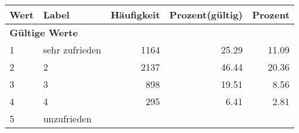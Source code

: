      \begin{longtable}{lXrrr}
     \toprule
     \textbf{Wert} & \textbf{Label} & \textbf{Häufigkeit} & \textbf{Prozent(gültig)} & \textbf{Prozent} \\
     \endhead
     \midrule
     \multicolumn{5}{l}{\textbf{Gültige Werte}}\\

     1 &
     \multicolumn{1}{X}{ sehr zufrieden   } &


       \num{1164} &
       \num[round-mode=places,round-precision=2]{25,29} &
         \num[round-mode=places,round-precision=2]{11,09} \\

     2 &
     \multicolumn{1}{X}{ 2   } &


       \num{2137} &
       \num[round-mode=places,round-precision=2]{46,44} &
         \num[round-mode=places,round-precision=2]{20,36} \\

     3 &
     \multicolumn{1}{X}{ 3   } &


       \num{898} &
       \num[round-mode=places,round-precision=2]{19,51} &
         \num[round-mode=places,round-precision=2]{8,56} \\

     4 &
     \multicolumn{1}{X}{ 4   } &


       \num{295} &
       \num[round-mode=places,round-precision=2]{6,41} &
         \num[round-mode=places,round-precision=2]{2,81} \\

     5 &
     \multicolumn{1}{X}{ unzufrieden   } &



\end{longtable}
